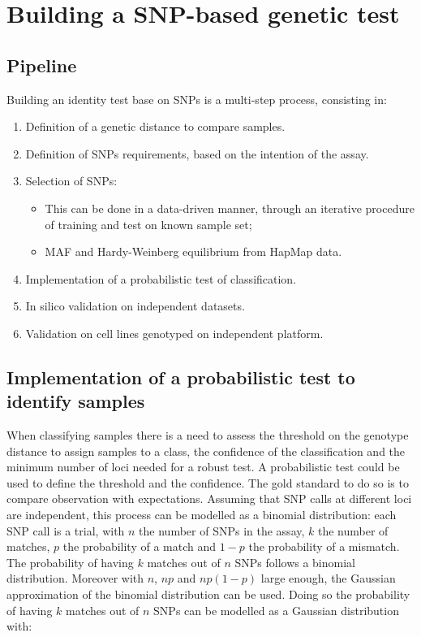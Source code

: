 \section{Building a SNP-based genetic test}

	\subsection{Pipeline}
	Building an identity test base on SNPs is a multi-step process, consisting in:

	\begin{multicols}{2}
		\begin{enumerate}
			\item Definition of a genetic distance to compare samples.
			\item Definition of SNPs requirements, based on the intention of the assay.
			\item Selection of SNPs:
			\begin{itemize}
				\item This can be done in a data-driven manner, through an iterative procedure of training and test on known sample set;
				\item MAF and Hardy-Weinberg equilibrium from HapMap data.
			\end{itemize}
			\item Implementation of a probabilistic test of classification.
			\item In silico validation on independent datasets.
			\item Validation on cell lines genotyped on independent platform.
		\end{enumerate}
	\end{multicols}

	\subsection{Implementation of a probabilistic test to identify samples}
	When classifying samples there is a need to assess the threshold on the genotype distance to assign samples to a class, the confidence of the classification and the minimum number of loci needed for a robust test.
	A probabilistic test could be used to define the threshold and the confidence.
	The gold standard to do so is to compare observation with expectations.
	Assuming that SNP calls at different loci are independent, this process can be modelled as a binomial distribution: each SNP call is a trial, with $n$ the number of SNPs in the assay, $k$ the number of matches, $p$ the probability of a match and $1-p$ the probability of a mismatch.
	The probability of having $k$ matches out of $n$ SNPs follows a binomial distribution.
	Moreover with $n$, $np$ and $np(1-p)$ large enough, the Gaussian approximation of the binomial distribution can be used.
	Doing so the probability of having $k$ matches out of $n$ SNPs can be modelled as a Gaussian distribution with:

